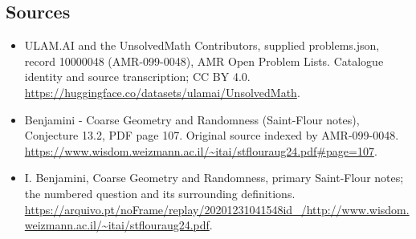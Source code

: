 \documentclass[11pt,a4paper]{article}
\begin{document}
\subsection{Sources}
\begin{itemize}
\item[S1] ULAM.AI and the UnsolvedMath Contributors, supplied problems.json, record 10000048 (AMR-099-0048), AMR Open Problem Lists. Catalogue identity and source transcription; CC BY 4.0.
\url{https://huggingface.co/datasets/ulamai/UnsolvedMath}.
\item[S2] Benjamini - Coarse Geometry and Randomness (Saint-Flour notes), Conjecture 13.2, PDF page 107. Original source indexed by AMR-099-0048.
\url{https://www.wisdom.weizmann.ac.il/~itai/stflouraug24.pdf#page=107}.
\item[S3] I. Benjamini, Coarse Geometry and Randomness, primary Saint-Flour notes; the numbered question and its surrounding definitions.
\url{https://arquivo.pt/noFrame/replay/20201231041548id_/http://www.wisdom.weizmann.ac.il/~itai/stflouraug24.pdf}.
\end{itemize}
\end{document}

